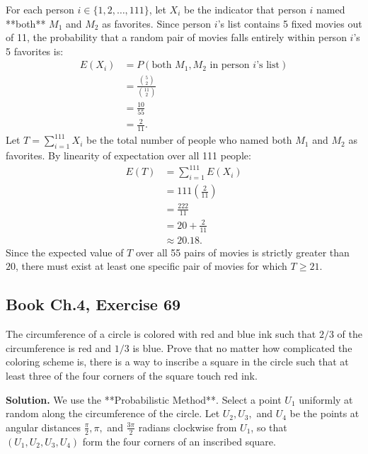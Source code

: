 \documentclass[11pt,a4paper]{article}
\begin{document}
For each person $i \in \{1, 2, \dots, 111\}$, let $X_i$ be the indicator that person $i$ named **both** $M_1$ and $M_2$ as favorites. Since person $i$'s list contains 5 fixed movies out of 11, the probability that a random pair of movies falls entirely within person $i$'s 5 favorites is:
\begin{align*}
E(X_i) &= P(\text{both } M_1, M_2 \text{ in person } i\text{'s list}) \\
&= \frac{\binom{5}{2}}{\binom{11}{2}} \\
&= \frac{10}{55} \\
&= \frac{2}{11}.
\end{align*}
Let $T = \sum_{i=1}^{111} X_i$ be the total number of people who named both $M_1$ and $M_2$ as favorites. By linearity of expectation over all 111 people:
\begin{align*}
E(T) &= \sum_{i=1}^{111} E(X_i) \\
&= 111 \left(\frac{2}{11}\right) \\
&= \frac{222}{11} \\
&= 20 + \frac{2}{11} \\
&\approx 20.18.
\end{align*}
Since the expected value of $T$ over all 55 pairs of movies is strictly greater than $20$, there must exist at least one specific pair of movies for which $T \ge 21$.

\vspace{10pt}
\subsection{Book Ch.4, Exercise 69}
\begin{tcolorbox}[title={Book Ch.4, Exercise 69}]
The circumference of a circle is colored with red and blue ink such that $2/3$ of the circumference is red and $1/3$ is blue. Prove that no matter how complicated the coloring scheme is, there is a way to inscribe a square in the circle such that at least three of the four corners of the square touch red ink.
\end{tcolorbox}

\noindent \textbf{Solution.} We use the **Probabilistic Method**. Select a point $U_1$ uniformly at random along the circumference of the circle. Let $U_2, U_3,$ and $U_4$ be the points at angular distances $\frac{\pi}{2}, \pi,$ and $\frac{3\pi}{2}$ radians clockwise from $U_1$, so that $(U_1, U_2, U_3, U_4)$ form the four corners of an inscribed square.
\end{document}
